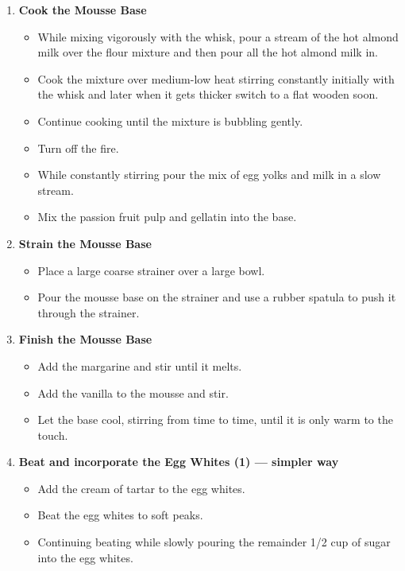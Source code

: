 \documentclass[11pt,letterpaper]{article}
\begin{document}
\begin{description}
\begin{enumerate}
	\item {\bf Cook the Mousse Base}
	\begin{itemize}
	\item While mixing vigorously with the whisk, pour a stream of the hot almond milk over the flour mixture and then pour all the hot almond milk in.
	\item Cook the mixture over medium-low heat stirring constantly initially with the whisk and later when it gets thicker switch to a flat wooden soon.
	\item Continue cooking until the mixture is bubbling gently.
	\item Turn off the fire.
	\item While constantly stirring pour the mix of egg yolks and milk in a slow stream.
	\item Mix the passion fruit pulp and gellatin into the base.
	\end{itemize}
	
	\item {\bf Strain the Mousse Base}
	\begin{itemize}
	\item Place a large coarse strainer over a large bowl.
	\item Pour the mousse base on the strainer and use a rubber spatula to push it through the strainer.
	\end{itemize}
	
	\item {\bf Finish the Mousse Base}
	\begin{itemize}
	\item Add the margarine and stir until it melts.
	\item Add the vanilla to the mousse and stir.
	\item Let the base cool, stirring from time to time, until it is only warm to the touch.
	\end{itemize}

	\item {\bf Beat and incorporate the Egg Whites (1) --- simpler way}
	\begin{itemize}
	\item Add the cream of tartar to the egg whites.
	\item Beat the egg whites to soft peaks.
	\item Continuing beating while slowly pouring the remainder 1/2 cup of sugar into the egg whites.
	\end{itemize}


\end{enumerate}
\end{description}
\end{document}
